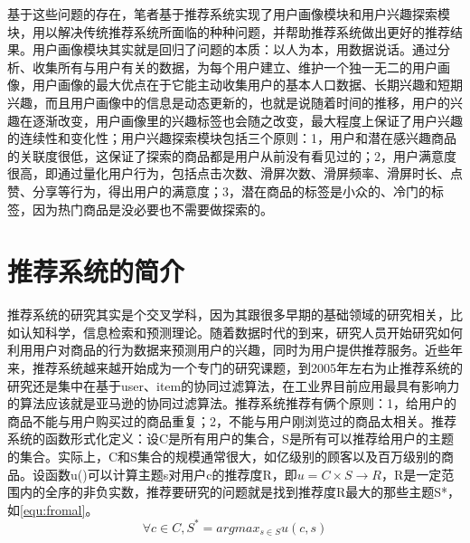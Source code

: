	基于这些问题的存在，笔者基于推荐系统实现了用户画像模块和用户兴趣探索模块，用以解决传统推荐系统所面临的种种问题，并帮助推荐系统做出更好的推荐结果。用户画像模块其实就是回归了问题的本质：以人为本，用数据说话。通过分析、收集所有与用户有关的数据，为每个用户建立、维护一个独一无二的用户画像，用户画像的最大优点在于它能主动收集用户的基本人口数据、长期兴趣和短期兴趣，而且用户画像中的信息是动态更新的，也就是说随着时间的推移，用户的兴趣在逐渐改变，用户画像里的兴趣标签也会随之改变，最大程度上保证了用户兴趣的连续性和变化性；用户兴趣探索模块包括三个原则：1，用户和潜在感兴趣商品的关联度很低，这保证了探索的商品都是用户从前没有看见过的；2，用户满意度很高，即通过量化用户行为，包括点击次数、滑屏次数、滑屏频率、滑屏时长、点赞、分享等行为，得出用户的满意度；3，潜在商品的标签是小众的、冷门的标签，因为热门商品是没必要也不需要做探索的。

\section{推荐系统的简介}
推荐系统的研究其实是个交叉学科，因为其跟很多早期的基础领域的研究相关，比如认知科学\citep{cognitive-science}，信息检索\citep{info-retrieval}和预测理论\citep{Forecast-principle}。随着数据时代的到来，研究人员开始研究如何利用用户对商品的行为数据来预测用户的兴趣，同时为用户提供推荐服务\citep{cf-sn}。近些年来，推荐系统越来越开始成为一个专门的研究课题，到2005年左右为止推荐系统的研究还是集中在基于user、item的协同过滤算法，在工业界目前应用最具有影响力的算法应该就是亚马逊的协同过滤算法\citep{Amazon-cf}。推荐系统推荐有俩个原则：1，给用户的商品不能与用户购买过的商品重复；2，不能与用户刚浏览过的商品太相关。推荐系统的函数形式化定义：设C是所有用户的集合，S是所有可以推荐给用户的主题的集合。实际上，C和S集合的规模通常很大，如亿级别的顾客以及百万级别的商品。设函数u()可以计算主题s对用户c的推荐度R，即$u=C\times S \rightarrow R$，R是一定范围内的全序的非负实数，推荐要研究的问题就是找到推荐度R最大的那些主题S*，如\autoref{equ:fromal}。
\begin{equation}
\forall c \in C,S^{*}=arg  max_{s \in S} u(c,s)
\label{equ:fromal}
\end{equation}

